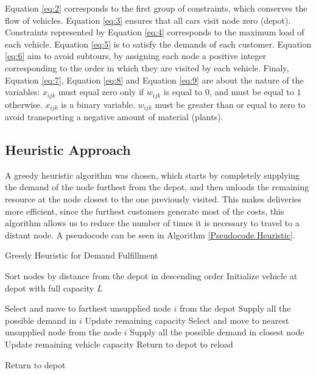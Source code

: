 \documentclass{amsart}
\begin{document}
        
        Equation \ref{eq:2} corresponds to the first group of constraints, which conserves the flow of vehicles. Equation \ref{eq:3} ensures that all cars visit node zero (depot). Constraints represented by Equation \ref{eq:4} corresponds to the maximum load of each vehicle. Equation \ref{eq:5} is to satisfy the demands of each customer. Equation \ref{eq:6} aim to avoid subtours, by assigning each node a positive integer corresponding to the order in which they are visited by each vehicle. Finaly, Equation \ref{eq:7}, Equation \ref{eq:8} and Equation \ref{eq:9} are about the nature of the variables: $x_{ijk}$ must equal zero only if $w_{ijk}$ is equal to $0$, and must be equal to $1$ otherwise. $x_{ijk}$ is a binary variable. $w_{ijk}$ must be greater than or equal to zero to avoid transporting a negative amount of material (plants).

        \subsection{Heuristic Approach}\label{MetodoHeuristico}
        A greedy heuristic algorithm was chosen, which starts by completely supplying the demand of the node furthest from the depot, and then unloads the remaining resource at the node closest to the one previously visited. This makes deliveries more efficient, since the furthest customers generate most of the costs, this algorithm allows us to reduce the number of times it is necessary to travel to a distant node. A pseudocode can be seen in Algorithm \ref{Pseudocode Heuristic}.
        
                \begin{algorithm}
    \caption{Greedy Heuristic for Demand Fulfillment}
    \begin{algorithmic}[1] 
        \State Sort nodes by distance from the depot in descending order
        \State Initialize vehicle at depot with full capacity $L$
        
            \State Select and move to farthest unsupplied node $i$ from the depot
            \State Supply all the possible demand in $i$
            \State Update remaining capacity
                \State Select and move to nearest unsupplied node from the node $i$
                \State Supply all the possible demand in closest node
                \State Update remaining vehicle capacity
            \Else
                \State Return to depot to reload
            \EndIf
        \EndWhile
        
        \State Return to depot
    \end{algorithmic}
\label{Pseudocode Heuristic} 
\end{algorithm}
            
\end{document}

